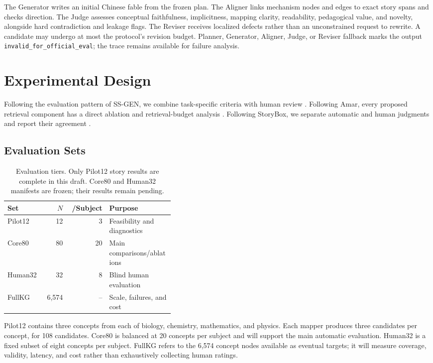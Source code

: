 \documentclass[letterpaper]{article} %
\begin{document}
The Generator writes an initial Chinese fable from the frozen plan. The Aligner links mechanism nodes and edges to exact story spans and checks direction. The Judge assesses conceptual faithfulness, implicitness, mapping clarity, readability, pedagogical value, and novelty, alongside hard contradiction and leakage flags. The Reviser receives localized defects rather than an unconstrained request to rewrite. A candidate may undergo at most the protocol's revision budget. Planner, Generator, Aligner, Judge, or Reviser fallback marks the output \texttt{invalid\_for\_official\_eval}; the trace remains available for failure analysis.

\section{Experimental Design}

Following the evaluation pattern of SS-GEN, we combine task-specific criteria with human review \citep{feng2025ssgen}. Following Amar, every proposed retrieval component has a direct ablation and retrieval-budget analysis \citep{xu2025amar}. Following StoryBox, we separate automatic and human judgments and report their agreement \citep{chen2026storybox}.

\subsection{Evaluation Sets}

\begin{table}[t]
\centering
\small
\begin{tabular}{lrrp{0.39\linewidth}}
\toprule
Set & $N$ & /Subject & Purpose \\
\midrule
Pilot12 & 12 & 3 & Feasibility and diagnostics \\
Core80 & 80 & 20 & Main comparisons/ablations \\
Human32 & 32 & 8 & Blind human evaluation \\
FullKG & 6,574 & -- & Scale, failures, and cost \\
\bottomrule
\end{tabular}
\caption{Evaluation tiers. Only Pilot12 story results are complete in this draft. Core80 and Human32 manifests are frozen; their results remain pending.}
\label{tab:sets}
\end{table}

Pilot12 contains three concepts from each of biology, chemistry, mathematics, and physics. Each mapper produces three candidates per concept, for 108 candidates. Core80 is balanced at 20 concepts per subject and will support the main automatic evaluation. Human32 is a fixed subset of eight concepts per subject. FullKG refers to the 6,574 concept nodes available as eventual targets; it will measure coverage, validity, latency, and cost rather than exhaustively collecting human ratings.
\end{document}
